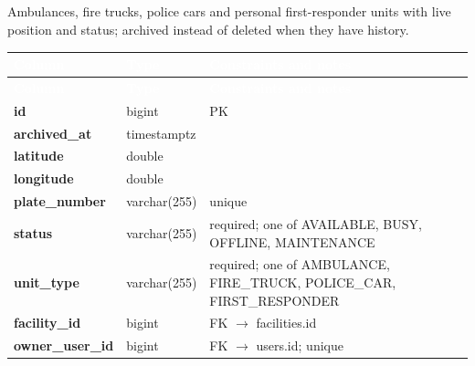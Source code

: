 \subsection*{}
Ambulances, fire trucks, police cars and personal first-responder units with live position and status; archived instead of deleted when they have history.\par\vspace{2pt}
{\tabfont\rowband
\begin{longtable}{@{}>{\raggedright\arraybackslash}p{}>{\raggedright\arraybackslash}p{}>{\raggedright\arraybackslash}p{}@{}}
\rowcolor{najdanavy}\textcolor{white}{\sffamily\bfseries\small Column} & \textcolor{white}{\sffamily\bfseries\small Type} & \textcolor{white}{\sffamily\bfseries\small Constraints and notes}\\
\endfirsthead
\rowcolor{najdanavy}\textcolor{white}{\sffamily\bfseries\small Column} & \textcolor{white}{\sffamily\bfseries\small Type} & \textcolor{white}{\sffamily\bfseries\small Constraints and notes}\\
\endhead
\bottomrule\endlastfoot
\textbf{id} & bigint & PK\\
\textbf{archived\_\allowbreak{}at} & timestamptz & \\
\textbf{latitude} & double & \\
\textbf{longitude} & double & \\
\textbf{plate\_\allowbreak{}number} & varchar(255) & unique\\
\textbf{status} & varchar(255) & required; one of AVAILABLE, BUSY, OFFLINE, MAINTENANCE\\
\textbf{unit\_\allowbreak{}type} & varchar(255) & required; one of AMBULANCE, FIRE\_\allowbreak{}TRUCK, POLICE\_\allowbreak{}CAR, FIRST\_\allowbreak{}RESPONDER\\
\textbf{facility\_\allowbreak{}id} & bigint & FK $\rightarrow$ facilities.id\\
\textbf{owner\_\allowbreak{}user\_\allowbreak{}id} & bigint & FK $\rightarrow$ users.id; unique\\
\end{longtable}}


